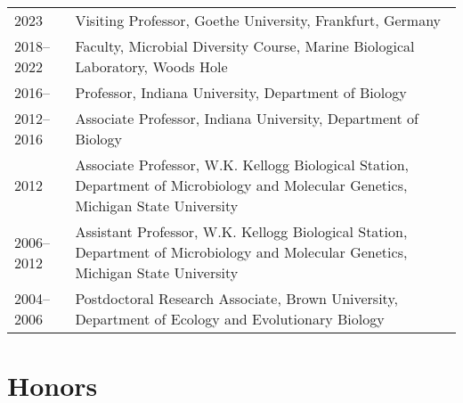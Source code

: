 \documentclass[11pt]{article}  %
\begin{document}
\begin{tabularx}{\textwidth}{@{}l@{\hspace{2em}}X@{}}
2023         & Visiting Professor, Goethe University, Frankfurt, Germany \\
2018--2022   & Faculty, Microbial Diversity Course, Marine Biological Laboratory, Woods Hole \\
2016--       & Professor, Indiana University, Department of Biology \\
2012--2016   & Associate Professor, Indiana University, Department of Biology\\
2012         & Associate Professor, W.K. Kellogg Biological Station, Department of Microbiology and Molecular Genetics, Michigan State University \\
2006--2012   & Assistant Professor, W.K. Kellogg Biological Station, Department of Microbiology and Molecular Genetics, Michigan State University \\
2004--2006   & Postdoctoral Research Associate, Brown University, Department of Ecology and Evolutionary Biology \\
\end{tabularx}
\vspace{-1.9em} %
\section*{Honors}
\vspace{-1.25em} %
\noindent
\end{document}
